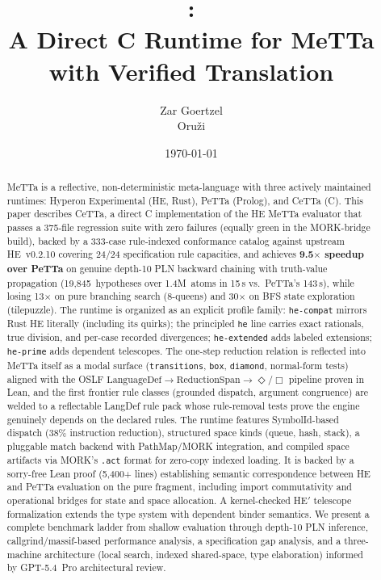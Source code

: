 \documentclass[11pt]{article}
\title{\CeTTa{}:\\
\large A Direct C Runtime for MeTTa with Verified Translation}
\author{Zar Goertzel\\Oru\v{z}i}
\date{\today}
\newcommand{\code}[1]{\texttt{#1}}
\newcommand{\PeTTa}{\textup{PeTTa}}
\newcommand{\HE}{\textup{HE}}
\newcommand{\CeTTa}{\textup{CeTTa}}
\begin{document}
\maketitle

\begin{abstract}
MeTTa is a reflective, non-deterministic meta-language with three
actively maintained runtimes: Hyperon Experimental (\HE{}, Rust),
\PeTTa{} (Prolog), and \CeTTa{} (C).  This paper describes \CeTTa{},
a direct C implementation of the \HE{} MeTTa evaluator that passes a
375-file regression suite with zero failures (equally green in the
MORK-bridge build), backed by a 333-case rule-indexed conformance
catalog against upstream \HE{}~v0.2.10 covering 24/24 specification
rule capacities, and achieves \textbf{9.5$\times$ speedup over
\PeTTa{}} on genuine depth-10 PLN backward chaining with truth-value
propagation (19{,}845~hypotheses over 1.4M~atoms in 15\,s vs.\
\PeTTa{}'s 143\,s), while losing 13$\times$ on pure branching search
(8-queens) and 30$\times$ on BFS state exploration (tilepuzzle).
The runtime is organized as an explicit profile family:
\code{he-compat} mirrors Rust \HE{} literally (including its quirks);
the principled \code{he} line carries exact rationals, true division,
and per-case recorded divergences; \code{he-extended} adds labeled
extensions; \code{he-prime} adds dependent telescopes.  The one-step
reduction relation is reflected into MeTTa itself as a modal surface
(\code{transitions}, \code{box}, \code{diamond}, normal-form tests)
aligned with the OSLF
$\mathrm{LanguageDef}\to\mathrm{ReductionSpan}\to\Diamond/\Box$
pipeline proven in Lean, and the first frontier rule classes (grounded
dispatch, argument congruence) are welded to a reflectable LangDef
rule pack whose rule-removal tests prove the engine genuinely depends
on the declared rules.
The runtime features SymbolId-based dispatch (38\% instruction
reduction), structured space kinds (queue, hash, stack), a pluggable
match backend with PathMap/MORK integration, and compiled space
artifacts via MORK's \code{.act} format for zero-copy indexed loading.
It is backed by a sorry-free Lean proof (5{,}400+ lines) establishing
semantic correspondence between \HE{} and \PeTTa{} evaluation on the
pure fragment, including import commutativity and operational bridges
for state and space allocation.  A kernel-checked HE$'$ telescope
formalization extends the type system with dependent binder semantics.
We present a complete benchmark ladder from shallow evaluation through
depth-10 PLN inference, callgrind/massif-based performance analysis,
a specification gap analysis, and a three-machine architecture (local
search, indexed shared-space, type elaboration) informed by GPT-5.4~Pro
architectural review.
\end{abstract}
\end{document}
